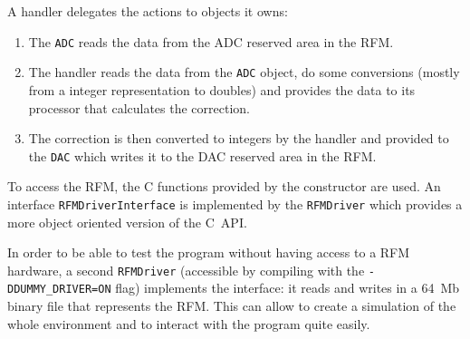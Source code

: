A handler delegates the actions to objects it owns:
\begin{enumerate}
    \item The \texttt{ADC} reads the data from the ADC reserved area in the RFM.
    \item The handler reads the data from the \texttt{ADC} object, do some conversions (mostly from a integer representation to doubles) and provides the data to its processor that calculates the correction.
    \item The correction is then converted to integers by the handler and provided to the \texttt{DAC} which writes it to the DAC reserved area in the RFM.
\end{enumerate}

To access the RFM, the C functions provided by the constructor are used. An interface \texttt{RFMDriverInterface} is implemented by the \texttt{RFMDriver} which provides a more object oriented version of the C~API.

\remark In order to be able to test the program without having access to a RFM hardware, a second \texttt{RFMDriver} (accessible by compiling with the \texttt{-DDUMMY\_DRIVER=ON} flag) implements the interface: it reads and writes in a 64~Mb binary file that represents the RFM. This can allow to create a simulation of the whole environment and to interact with the program quite easily.

